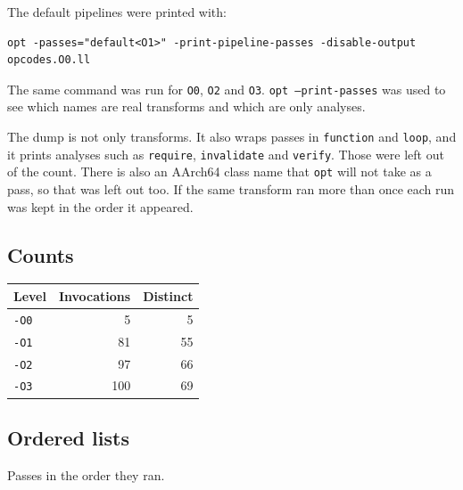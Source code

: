 \documentclass[11pt,a4paper]{article}
\begin{document}
The default pipelines were printed with:

\begin{lstlisting}[language={},basicstyle=\ttfamily\footnotesize]
opt -passes="default<O1>" -print-pipeline-passes -disable-output opcodes.O0.ll
\end{lstlisting}

The same command was run for \texttt{O0}, \texttt{O2} and \texttt{O3}.
\texttt{opt --print-passes} was used to see which names are real
transforms and which are only analyses.

The dump is not only transforms. It also wraps passes in
\texttt{function} and \texttt{loop}, and it prints analyses such as
\texttt{require}, \texttt{invalidate} and \texttt{verify}. Those were
left out of the count. There is also an AArch64 class name that
\texttt{opt} will not take as a pass, so that was left out too. If
the same transform ran more than once each run was kept in the
order it appeared.

\subsection*{Counts}

\begin{tabular}{lrr}
\hline
Level & Invocations & Distinct \\
\hline
\texttt{-O0} & 5 & 5 \\
\texttt{-O1} & 81 & 55 \\
\texttt{-O2} & 97 & 66 \\
\texttt{-O3} & 100 & 69 \\
\hline
\end{tabular}

\subsection*{Ordered lists}

Passes in the order they ran.
\end{document}
